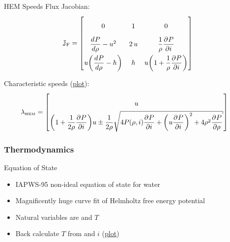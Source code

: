 \documentclass[10pt,t,xcolor=table]{beamer}
\newenvironment{Itemize}
    {\begin{itemize}\setlength{\itemsep}{0.8em}\setlength{\leftmargin}{0.0em}\setlength{\labelwidth}{0em}}
    {\end{itemize}}
\begin{document}
    \begin{frame}[label=AcousticSpeedsMain]{HEM Speeds}
        Flux Jacobian:
        \begin{equation}
            \renewcommand*{\arraystretch}{2.2}
            \JacobF = 
                \begin{bmatrix}
                    0 & 1 & 0 \\
                    \diff{P}{\rho} - u^2 & 2\,u & \oneo{\rho}\pdiff{P}{i} \\
                    u \left(\diff{P}{\rho} - h\right) & h & u\left(1 + \oneo{\rho}\pdiff{P}{i}\right) 
                \end{bmatrix}
                \label{Eqn:FluxJacobianHEM}
        \end{equation}
        
        Characteristic speeds (\hyperlink{AcousticSpeeds}{plot}):
        \begin{equation}
            \renewcommand*{\arraystretch}{2.2}
            \hspace{-1em}
            \Speeds\subs{\tiny HEM} =   
                \begin{bmatrix}
                    u \\
                    \left(1 + \oneo{2\rho}\pdiff{P}{i}\right)u  \pm \oneo{2 \rho}\;\Sqrt{4 P(\rho,i) \pdiff{P}{i}+\left(u\pdiff{P}{i}\right)^2 + 4 \rho^2 \pdiff{P}{\rho}}
                \end{bmatrix}
                \label{Eqn:SpeedsHEM}
        \end{equation}
    \end{frame}


    \subsubsection*{Thermodynamics}
    \begin{frame}[label=EOS]{Equation of State}
        \begin{Itemize}
            \item{IAPWS-95 non-ideal equation of state for water}
            \item{Magnificently huge curve fit of Helmholtz free energy potential}
            \item{Natural variables are \rho and $T$}
            \item{Back calculate $T$ from \rho and $i$ (\hyperlink{irhoSpace}{plot})}
        \end{Itemize}
    \end{frame}
\end{document}
